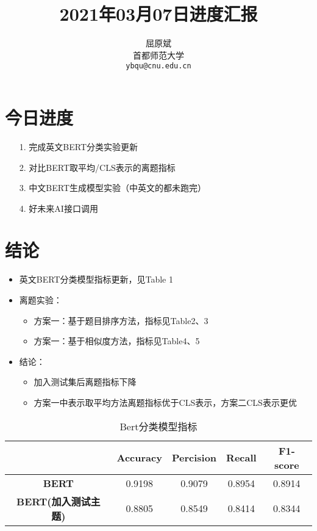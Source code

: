 \documentclass[11pt]{article}
\title{2021年03月07日进度汇报}
\author{屈原斌 \\
  首都师范大学 \\
    {\tt ybqu@cnu.edu.cn}}
\date{}
\begin{document}
\begin{CJK}{UTF8}{gkai}

\maketitle
\CJKindent


\section{今日进度}


\begin{itemize}
\item [1.] 完成英文BERT分类实验更新
\item [2.] 对比BERT取平均/CLS表示的离题指标
\item [3.] 中文BERT生成模型实验（中英文的都未跑完）
\item [4.] 好未来AI接口调用
\end{itemize}

\section{结论}
\begin{itemize}
  \item 英文BERT分类模型指标更新，见Table 1
  \item 离题实验：
  \begin{itemize}
    \item 方案一：基于题目排序方法，指标见Table2、3
    \item 方案一：基于相似度方法，指标见Table4、5
  \end{itemize}
  \item 结论：
  \begin{itemize}
    \item 加入测试集后离题指标下降
    \item 方案一中表示取平均方法离题指标优于CLS表示，方案二CLS表示更优
  \end{itemize}
\end{itemize}

\begin{table}[htbp]
  \centering
  \begin{tabular}{c|c|c|c|c}
    \hline
    & \textbf{Accuracy} & \textbf{Percision} & \textbf{Recall} & \textbf{F1-score} \\
    \hline
    \textbf{BERT} & 0.9198 & 0.9079 & 0.8954 & 0.8914 \\
    \hline
    \textbf{BERT(加入测试主题)} & 0.8805 & 0.8549 & 0.8414 & 0.8344 \\
    \hline
  \end{tabular}%
  \caption{Bert分类模型指标}
  \label{tab:addlabel}%
\end{table}%


\end{CJK}
\end{document}
